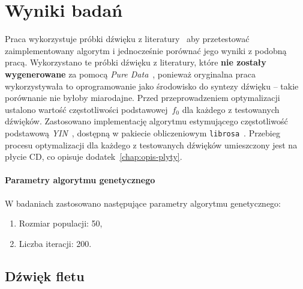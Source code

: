 \chapter{Wyniki badań}\label{chap:research}



Praca wykorzystuje próbki dźwięku z literatury~\cite{evolutionary_puredata_results}
aby przetestować zaimplementowany algorytm i jednocześnie porównać jego wyniki
z podobną pracą. Wykorzystano te próbki dźwięku
z literatury, które \textbf{nie zostały wygenerowane} za pomocą
\textit{Pure Data}~\cite{pure_data}, ponieważ oryginalna praca wykorzystywała
to oprogramowanie jako środowisko do syntezy dźwięku -- takie porównanie
nie byłoby miarodajne.
Przed przeprowadzeniem optymalizacji ustalono wartość częstotliwości podstawowej~$f_0$
dla każdego z testowanych dźwięków. Zastosowano implementację algorytmu
estymującego częstotliwość podstawową
\textit{YIN}~\cite{yin_pitch_estimation}, dostępną w pakiecie obliczeniowym
\texttt{librosa}~\cite{librosa}. Przebieg procesu optymalizacji dla każdego z testowanych
dźwięków umieszczony jest na płycie CD, co opisuje dodatek~\ref{chap:opis-plyty}.

\subsubsection{Parametry algorytmu genetycznego}

W badaniach zastosowano następujące parametry algorytmu genetycznego:

\begin{enumerate}
  \item Rozmiar populacji: 50,
  \item Liczba iteracji: 200.
\end{enumerate}

\section{Dźwięk fletu}

